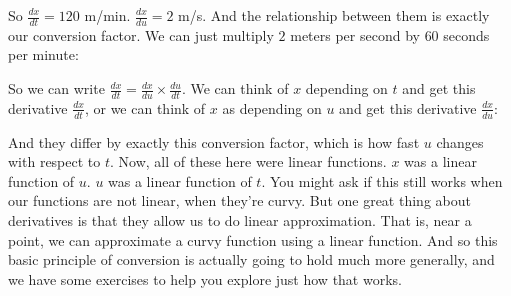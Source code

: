 \documentclass[pdftex, brazil, 12pt, twoside]{article}
\begin{document}
So $\displaystyle \frac{dx}{dt} = 120$ m/min.
$\displaystyle \frac{dx}{du} = 2$ m/s.
And the relationship between them
is exactly our conversion factor.
We can just multiply $2$ meters per second
by $60$ seconds per minute:

\begin{figure}[H]
  \begin{center}
  \end{center}
\end{figure}

So we can write $\displaystyle \frac{dx}{dt} = \frac{dx}{du} \times \frac{du}{dt}$.
We can think of $x$ depending on $t$ and get this derivative $\displaystyle \frac{dx}{dt}$,
or we can think of $x$ as depending on $u$
and get this derivative $\displaystyle \frac{dx}{du}$:

\begin{figure}[H]
  \begin{center}
  \end{center}
\end{figure}

And they differ by exactly this conversion factor,
which is how fast $u$ changes with respect to $t$.
Now, all of these here were linear functions.
$x$ was a linear function of $u$.
$u$ was a linear function of $t$.
You might ask if this still works when our functions are
not linear, when they're curvy.
But one great thing about derivatives
is that they allow us to do linear approximation.
That is, near a point, we can approximate a curvy function
using a linear function.
And so this basic principle of conversion
is actually going to hold much more generally,
and we have some exercises to help
you explore just how that works.
\end{document}
